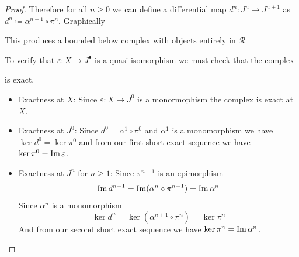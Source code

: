 \documentclass[../../../main]{subfiles}
\begin{document}
\begin{proof}
  Therefore for all \(n \geq 0\) we can define a differential map \(d^{n}: J^{n} \to J^{n+1}\) as \(d^{n} \coloneq \alpha^{n+1} \circ \pi^{n}\).
  Graphically
  \begin{center}
  \end{center}
  This produces a bounded below complex with objects entirely in \(\mathcal{R}\)
  \begin{center}
  \end{center}
  To verify that \(\varepsilon: X \to J^{\bullet}\) is a quasi-isomorphism we must check that the complex
  \begin{center}
  \end{center}
  is exact.
  \begin{itemize}
    \item Exactness at \(X\): Since \(\varepsilon: X \to J^{0}\) is a monormophism the complex is exact at \(X\).
    \item Exactness at \(J^{0}\): Since \(d^{0} = \alpha^{1} \circ \pi^{0}\) and \(\alpha^{1}\) is a monomorphism we have \(\ker d^{0} = \ker \pi^{0}\) and from our first short exact sequence we have \(\ker \pi^{0} = \operatorname*{Im} \varepsilon\).
    \item Exactness at \(J^{n}\) for \(n \geq 1\): Since \(\pi^{n-1}\) is an epimorphism
          \begin{equation*}
            \operatorname*{Im} d^{n-1} = \operatorname*{Im} (\alpha^{n} \circ \pi^{n-1}) = \operatorname*{Im} \alpha^{n}
          \end{equation*}
          Since \(\alpha^{n}\) is a monomorphism
          \begin{equation*}
            \ker d^{n} = \ker (\alpha^{n+1} \circ \pi^{n}) = \ker \pi^{n}
          \end{equation*}
          And from our second short exact sequence we have \(\ker \pi^{n} = \operatorname*{Im} \alpha^{n}\).
  \end{itemize}
\end{proof}
\end{document}
